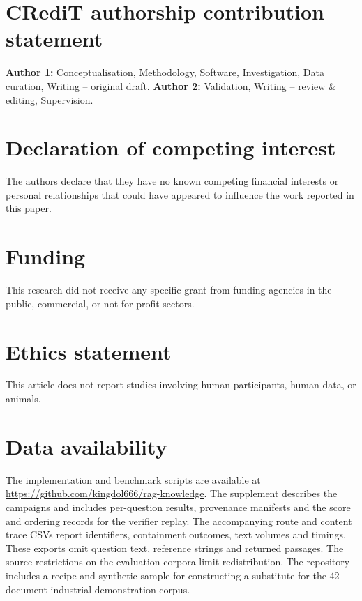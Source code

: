 
\section*{CRediT authorship contribution statement}
\textbf{Author 1:} Conceptualisation, Methodology, Software, Investigation,
Data curation, Writing -- original draft. \textbf{Author 2:} Validation,
Writing -- review \& editing, Supervision. %

\section*{Declaration of competing interest}
The authors declare that they have no known competing financial interests
or personal relationships that could have appeared to influence the work
reported in this paper.

\section*{Funding}
This research did not receive any specific grant from funding agencies in
the public, commercial, or not-for-profit sectors. %

\section*{Ethics statement}
This article does not report studies involving human participants, human
data, or animals.

\section*{Data availability}
The implementation and benchmark scripts are available at
\url{https://github.com/kingdol666/rag-knowledge}. The supplement describes
the campaigns and includes per-question results, provenance manifests and
the score and ordering records for the verifier replay. The accompanying
route and content trace CSVs report identifiers, containment outcomes, text
volumes and timings. These exports omit question text, reference strings and
returned passages. The source restrictions on the evaluation corpora limit
redistribution. The repository includes a recipe and synthetic sample for
constructing a substitute for the 42-document industrial demonstration
corpus.

